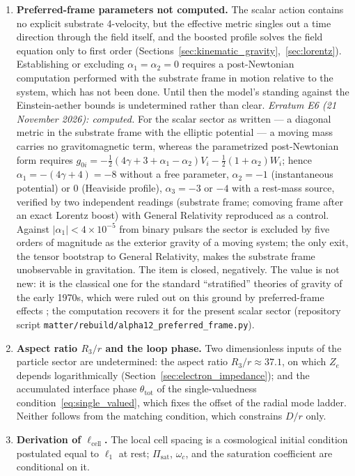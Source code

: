 \documentclass[11pt,a4paper]{article}
\theoremstyle{plain}
\theoremstyle{remark}
\begin{document}
\begin{enumerate}
    \item \textbf{Preferred-frame parameters not computed.} The scalar action contains no explicit substrate 4-velocity, but the effective metric singles out a time direction through the field itself, and the boosted profile solves the field equation only to first order (Sections~\ref{sec:kinematic_gravity},~\ref{sec:lorentz}). Establishing or excluding $\alpha_1 = \alpha_2 = 0$ requires a post-Newtonian computation performed with the substrate frame in motion relative to the system, which has not been done. Until then the model's standing against the Einstein-aether bounds is undetermined rather than clear. \emph{Erratum E6 (21 November 2026): computed.} For the scalar sector as written --- a diagonal metric in the substrate frame with the elliptic potential --- a moving mass carries no gravitomagnetic term, whereas the parametrized post-Newtonian form requires $g_{0i} = -\tfrac12(4\gamma+3+\alpha_1-\alpha_2)V_i - \tfrac12(1+\alpha_2)W_i$; hence $\alpha_1 = -(4\gamma+4) = -8$ without a free parameter, $\alpha_2 = -1$ (instantaneous potential) or $0$ (Heaviside profile), $\alpha_3 = -3$ or $-4$ with a rest-mass source, verified by two independent readings (substrate frame; comoving frame after an exact Lorentz boost) with General Relativity reproduced as a control. Against $|\alpha_1| < 4\times10^{-5}$ from binary pulsars the sector is excluded by five orders of magnitude as the exterior gravity of a moving system; the only exit, the tensor bootstrap to General Relativity, makes the substrate frame unobservable in gravitation. The item is closed, negatively. The value is not new: it is the classical one for the standard ``stratified'' theories of gravity of the early 1970s, which were ruled out on this ground by preferred-frame effects \cite{ni1972,nordtvedtwill1972}; the computation recovers it for the present scalar sector (repository script \texttt{matter/rebuild/alpha12\_preferred\_frame.py}).
    \item \textbf{Aspect ratio $R_3/r$ and the loop phase.} Two dimensionless inputs of the particle sector are undetermined: the aspect ratio $R_3/r \approx 37.1$, on which $Z_e$ depends logarithmically (Section~\ref{sec:electron_impedance}); and the accumulated interface phase $\theta_{\text{tot}}$ of the single-valuedness condition~\eqref{eq:single_valued}, which fixes the offset of the radial mode ladder. Neither follows from the matching condition, which constrains $D/r$ only.
    \item \textbf{Derivation of $\ell_{\text{cell}}$.} The local cell spacing is a cosmological initial condition postulated equal to $\ell_1$ at rest; $\Pi_{\text{sat}}$, $\omega_c$, and the saturation coefficient are conditional on it.

\end{enumerate}
\end{document}
